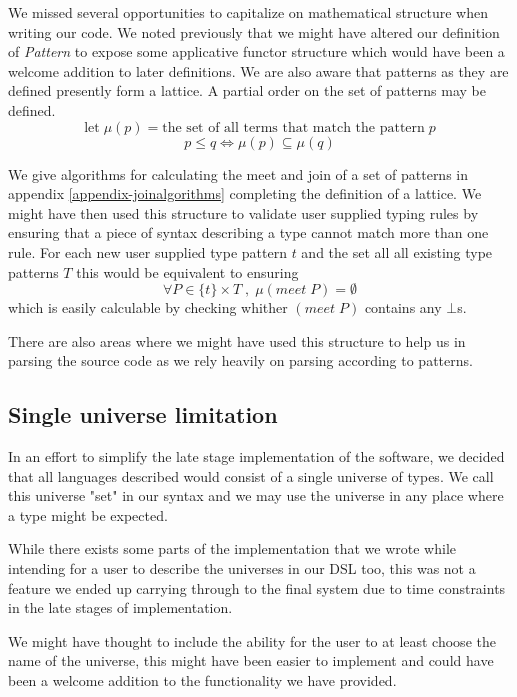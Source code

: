 We missed several opportunities
to capitalize on mathematical structure when writing our
code. We noted previously that we might have altered 
our definition of \emph{Pattern} to expose some applicative functor
structure which would have been a welcome addition to later
definitions. We are also aware that patterns as they are defined
presently form a lattice. A partial order on the set of patterns may
be defined.
$$
\mbox{let} \;μ(p) = \mbox{the set of all terms that match the pattern}\;p
$$
$$
p \leq q \iff \mu (p) \subseteq  \mu (q)
$$

We give algorithms for calculating the meet and join of a set of
patterns in appendix \ref{appendix-joinalgorithms} completing the
definition of a lattice. We might have then used this structure to
validate user supplied typing rules by ensuring that a piece of syntax
describing a type cannot match more than one rule. For each new user
supplied type pattern $t$ and the set all all existing type patterns $T$
this would be equivalent to ensuring
$$
\forall P \in \{t\} × T \;,\; \mu (meet \; P) = \emptyset
$$
which is easily calculable by checking whither $(meet \; P)$ contains
any $\bot$s.

There are also areas where we might have used this structure to help
us in parsing the source code as we rely heavily on parsing according
to patterns.

\subsection{Single universe limitation}

In an effort to simplify the late stage implementation of the
software, we decided that all languages described would consist of a
single universe of types. We call this universe "set" in our syntax
and we may use the universe in any place where a type might be
expected.

While there exists some parts of the implementation that we wrote
while intending for a user to describe the universes in our DSL too,
this was not a feature we ended up carrying through to the final
system due to time constraints in the late stages of implementation.

We might have thought to include the ability for the user to at least
choose the name of the universe, this might have been easier to
implement and could have been a welcome addition to the functionality
we have provided.

\subsection{Code quality}

